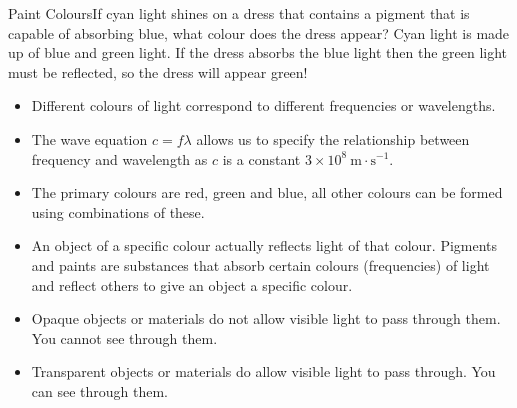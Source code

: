 \vspace{-1.25cm} %

\begin{wex}{Paint Colours}{If cyan light shines on a dress that contains a pigment that is capable of absorbing blue, what colour does the dress appear?}
{
Cyan light is made up of blue and green light.
If the dress absorbs the blue light then the green light must be reflected, so the dress will appear green!}
\end{wex}

\clearpage


\begin{itemize}
\item Different colours of light correspond to different frequencies or wavelengths.
\item The wave equation $c=f\lambda$ allows us to specify the relationship between frequency and wavelength as $c$ is a constant $3\times10^8~\text{m}\cdot\text{s}^{-1}$.
\item The primary colours are red, green and blue, all other colours can be formed using combinations of these.
\item An object of a specific colour actually reflects light of that colour. Pigments and paints are substances that absorb certain colours (frequencies) of light and reflect others to give an object a specific colour.
\item Opaque objects or materials do not allow visible light to pass through them. You cannot see through them.
\item Transparent objects or materials do allow visible light to pass through. You can see through them.
\end{itemize}

